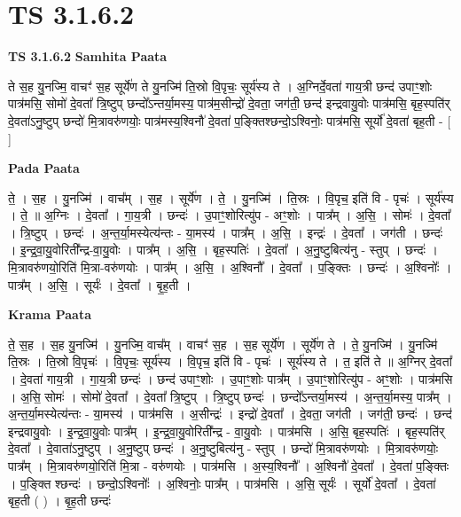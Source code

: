 \documentclass[17pt]{extarticle}
\begin{document}
\section{ TS 3.1.6.2 }

\textbf{TS 3.1.6.2 } \newline
\textbf{Samhita Paata} \newline

ते स॒ह यु॒नज्मि॒ वाचꣳ॑ स॒ह सूर्ये॑ण ते यु॒नज्मि॑ ति॒स्रो वि॒पृचः॒ सूर्य॑स्य ते । अ॒ग्निर्दे॒वता॑ गाय॒त्री छन्द॑ उपाꣳ॒॒शोः पात्र॑मसि॒ सोमो॑ दे॒वता᳚ त्रि॒ष्टुप् छन्दो᳚ऽन्तर्या॒मस्य॒ पात्र॑म॒सीन्द्रो॑ दे॒वता॒ जग॑ती॒ छन्द॑ इन्द्रवायु॒वोः पात्र॑मसि॒ बृह॒स्पति॑र् दे॒वता॑ऽनु॒ष्टुप् छन्दो॑ मि॒त्रावरु॑णयोः॒ पात्र॑मस्य॒श्विनौ॑ दे॒वता॑ प॒ङ्क्तिश्छन्दो॒ऽश्विनोः॒ पात्र॑मसि॒ सूर्यो॑ दे॒वता॑ बृह॒ती - [  ] \newline

\textbf{Pada Paata} \newline

ते॒ । स॒ह । यु॒नज्मि॑ । वाच᳚म् । स॒ह । सूर्ये॑ण । ते॒ । यु॒नज्मि॑ । ति॒स्रः । वि॒पृच॒ इति॑ वि - पृचः॑ । सूर्य॑स्य । ते॒ ॥ अ॒ग्निः । दे॒वता᳚ । गा॒य॒त्री । छन्दः॑ । उ॒पाꣳ॒॒शोरित्यु॑प - अꣳ॒॒शोः । पात्र᳚म् । अ॒सि॒ । सोमः॑ । दे॒वता᳚ । त्रि॒ष्टुप् । छन्दः॑ । अ॒न्त॒र्या॒मस्येत्य॑न्तः - या॒मस्य॑ । पात्र᳚म् । अ॒सि॒ । इन्द्रः॑ । दे॒वता᳚ । जग॑ती । छन्दः॑ । इ॒न्द्र॒वा॒यु॒वोरिती᳚न्द्र-वा॒यु॒वोः । पात्र᳚म् । अ॒सि॒ । बृह॒स्पतिः॑ । दे॒वता᳚ । अ॒नु॒ष्टुबित्य॑नु - स्तुप् । छन्दः॑ । मि॒त्रावरु॑णयो॒रिति॑ मि॒त्रा-वरु॑णयोः । पात्र᳚म् । अ॒सि॒ । अ॒श्विनौ᳚ । दे॒वता᳚ । प॒ङ्क्तिः । छन्दः॑ । अ॒श्विनोः᳚ । पात्र᳚म् । अ॒सि॒ । सूर्यः॑ । दे॒वता᳚ । बृ॒ह॒ती ।  \newline


\textbf{Krama Paata} \newline

ते॒ स॒ह । स॒ह यु॒नज्मि॑ । यु॒नज्मि॒ वाच᳚म् । वाचꣳ॑ स॒ह । स॒ह सूर्ये॑ण । सूर्ये॑ण ते । ते॒ यु॒नज्मि॑ । यु॒नज्मि॑ ति॒स्रः । ति॒स्रो वि॒पृचः॑ । वि॒पृचः॒ सूर्य॑स्य । वि॒पृच॒ इति॑ वि - पृचः॑ । सूर्य॑स्य ते । त॒ इति॑ ते ॥ अ॒ग्निर् दे॒वता᳚ । दे॒वता॑ गाय॒त्री । गा॒य॒त्री छन्दः॑ । छन्द॑ उपाꣳ॒॒शोः । उ॒पाꣳ॒॒शोः पात्र᳚म् । उ॒पाꣳ॒॒शोरित्यु॑प - अꣳ॒॒शोः । पात्र॑मसि । अ॒सि॒ सोमः॑ । सोमो॑ दे॒वता᳚ । दे॒वता᳚ त्रि॒ष्टुप् । त्रि॒ष्टुप् छन्दः॑ । छन्दो᳚ऽन्तर्या॒मस्य॑ । अ॒न्त॒र्या॒मस्य॒ पात्र᳚म् । अ॒न्त॒र्या॒मस्येत्य॑न्तः - या॒मस्य॑ । पात्र॑मसि । अ॒सीन्द्रः॑ । इन्द्रो॑ दे॒वता᳚ । दे॒वता॒ जग॑ती । जग॑ती॒ छन्दः॑ । छन्द॑ इन्द्रवायु॒वोः । इ॒न्द्र॒वा॒यु॒वोः पात्र᳚म् । इ॒न्द्र॒वा॒यु॒वोरिती᳚न्द्र - वा॒यु॒वोः । पात्र॑मसि । अ॒सि॒ बृह॒स्पतिः॑ । बृह॒स्पति॑र् दे॒वता᳚ । दे॒वाता॑ऽनु॒ष्टुप् । अ॒नु॒ष्टुप् छन्दः॑ । अ॒नु॒ष्टुबित्य॑नु - स्तुप् । छन्दो॑ मि॒त्रावरु॑णयोः । मि॒त्रावरु॑णयोः॒ पात्र᳚म् । मि॒त्रावरु॑णयो॒रिति॑ मि॒त्रा - वरु॑णयोः । पात्र॑मसि । अ॒स्य॒श्विनौ᳚ । अ॒श्विनौ॑ दे॒वता᳚ । दे॒वता॑ प॒ङ्क्तिः । प॒ङ्क्ति श्छन्दः॑ । छन्दो॒ऽश्विनोः᳚ । अ॒श्विनोः॒ पात्र᳚म् । पात्र॑मसि । अ॒सि॒ सूर्यः॑ । सूर्यो॑ दे॒वता᳚ । दे॒वता॑ बृह॒ती ( ) । बृ॒ह॒ती छन्दः॑ \newline
\end{document}
